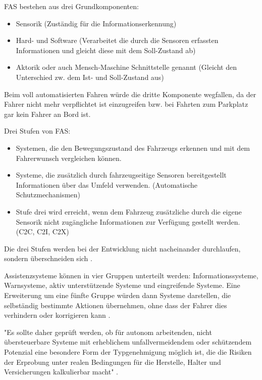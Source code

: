 FAS bestehen aus drei Grundkomponenten:

\begin{itemize}
	\item Sensorik (Zuständig für die Informationserkennung)
	\item Hard- und Software (Verarbeitet die durch die Sensoren erfassten Informationen und gleicht diese mit dem Soll-Zustand ab)
	\item Aktorik oder auch Mensch-Maschine Schnittstelle genannt (Gleicht den Unterschied zw. dem Ist- und Soll-Zustand aus) \parencite[S.10]{Blakaj.14.09.2016} 
\end{itemize}

Beim voll automatisierten Fahren würde die dritte Komponente wegfallen, da der Fahrer nicht mehr verpflichtet ist einzugreifen bzw. bei Fahrten zum Parkplatz gar kein Fahrer an Bord ist.

Drei Stufen von FAS:
\begin{itemize}
	\item Systemen, die den Bewegungszustand des Fahrzeugs erkennen und mit dem Fahrerwunsch vergleichen können.
	\item Systeme, die zusätzlich durch fahrzeugseitige Sensoren bereitgestellt Informationen über das Umfeld verwenden. (Automatische Schutzmechanismen)
	\item Stufe drei wird erreicht, wenn dem Fahrzeug zusätzliche durch die eigene Sensorik nicht zugängliche Informationen zur Verfügung gestellt werden. (C2C, C2I, C2X) 
\end{itemize}
Die drei Stufen werden bei der Entwicklung nicht nacheinander durchlaufen, sondern überschneiden sich \parencite[S.88]{WissenschaflicherBeiratbeimBundesministerfurVerkehrBauundStadtentwicklung.2011}.

Assistenzsysteme können in vier Gruppen unterteilt werden: Informationssysteme, Warnsysteme, aktiv unterstützende Systeme und eingreifende Systeme. Eine Erweiterung um eine fünfte Gruppe würden dann Systeme darstellen, die selbständig bestimmte Aktionen übernehmen, ohne dass der Fahrer dies verhindern oder korrigieren kann \parencite[S.13]{Vollrath.2006}.

"Es sollte daher geprüft werden, ob für autonom arbeitenden, nicht übersteuerbare Systeme mit erheblichem unfallvermeidendem oder schützendem Potenzial eine besondere Form der Typgenehmigung möglich ist, die die Risiken der Erprobung unter realen Bedingungen für die Herstelle, Halter und Versicherungen kalkulierbar macht" \parencite[S.89]{WissenschaflicherBeiratbeimBundesministerfurVerkehrBauundStadtentwicklung.2011}. 

